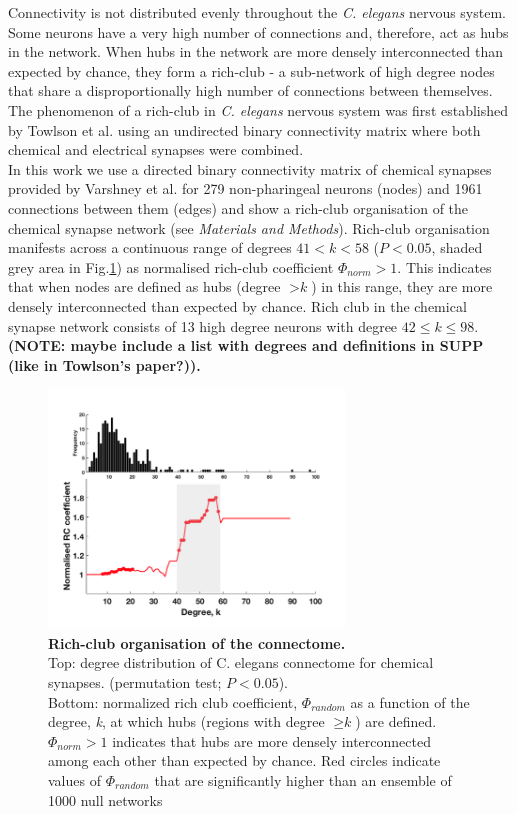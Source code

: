 \documentclass[10pt,letterpaper]{article}
\begin{document}
Connectivity is not distributed evenly throughout the \textit{C. elegans} nervous system.  
Some neurons have a very high number of connections and, therefore, act as hubs in the network. 
When hubs in the network are more densely interconnected than expected by chance, they form a rich-club - a sub-network of high degree nodes that share a disproportionally high number of connections between themselves. 
The phenomenon of a rich-club in \textit{C. elegans} nervous system was first established by Towlson et al. \cite{Towlson2013} using an undirected binary connectivity matrix where both chemical and electrical synapses were combined. \\
In this work we use a directed binary connectivity matrix of chemical synapses provided by Varshney et al. \cite{Varshney2011} for 279 non-pharingeal neurons (nodes) and 1961 connections between them (edges) and show a rich-club organisation of the chemical synapse network (see \textit{Materials and Methods}). 
Rich-club organisation manifests across a continuous range of degrees $41<k<58$ ($P<0.05$, shaded grey area in Fig.\ref{RCcoef}) as normalised rich-club coefficient $\Phi_{norm}>1$. 
This indicates that when nodes are defined as hubs (degree $>\textit{k}$) in this range, they are more densely interconnected than expected by chance.
Rich club in the chemical synapse network consists of 13 high degree neurons with degree $42 \leq k \leq 98$. \\
\textbf{(NOTE: maybe include a list with degrees and definitions in SUPP (like in Towlson's paper?)).}

\begin{figure}[!h]
   \centering
    \includegraphics[width=0.7\textwidth]{RCcurveFINAL}
 \caption{{\bf Rich-club organisation of the connectome.} \\
Top: degree distribution of C. elegans connectome for chemical synapses. (permutation test; $P<0.05$). \\
Bottom: normalized rich club coefficient, $\Phi_{random}$ as a function of the degree, \textit{k}, at which hubs (regions with degree $\geq \textit{k}$) are defined. 
$\Phi_{norm}>1$ indicates that hubs are more densely interconnected among each other than expected by chance. 
Red circles indicate values of $\Phi_{random}$ that are significantly higher than an ensemble of 1000 null networks}
 \label{RCcoef}
 \end{figure}
 
\end{document}
